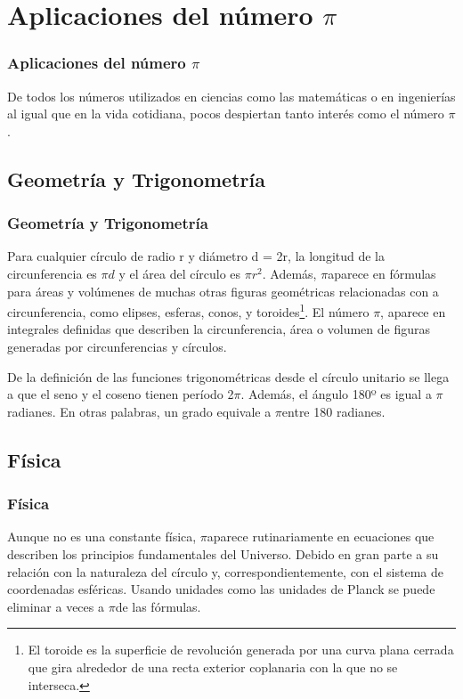 \documentclass{beamer}
\newcommand{\PI}{{$\pi$}}
\begin{document}
\section{Aplicaciones del número \PI}
\begin{frame}
\frametitle{Aplicaciones del número \PI}

De todos los números utilizados en ciencias como las matemáticas o en ingenierías al igual que en la vida cotidiana, pocos despiertan tanto interés como el número \PI.

\end{frame}

\subsection{Geometría y Trigonometría}
\begin{frame}
\frametitle{Geometría y Trigonometría}
Para cualquier círculo de radio r y diámetro d = 2r, la longitud de la circunferencia es \PI$d$ y el área del círculo es \PI$r^2$. Además, \PI aparece en fórmulas para áreas y volúmenes de muchas otras figuras geométricas relacionadas con a circunferencia, como elipses, esferas, conos, y toroides\footnote{El toroide es la superficie de revolución generada por una curva plana cerrada que gira alrededor de una recta exterior coplanaria con la que no se interseca.}. El número \PI, aparece en integrales definidas que describen la circunferencia, área o volumen de figuras generadas por circunferencias y círculos.

De la definición de las funciones trigonométricas desde el círculo unitario se llega a que el seno y el coseno tienen período 2\PI. Además, el ángulo 180º es igual a \PI radianes. En otras palabras, un grado equivale a \PI  entre 180 radianes.

\end{frame}

\subsection{Física}
\begin{frame}
\frametitle{Física}
Aunque no es una constante física, \PI aparece rutinariamente en ecuaciones que describen los principios fundamentales del Universo. Debido en gran parte a su relación con la naturaleza del círculo y, correspondientemente, con el sistema de coordenadas esféricas. Usando unidades como las unidades de Planck se puede eliminar a veces a \PI de las fórmulas.

\end{frame}
\end{document}
